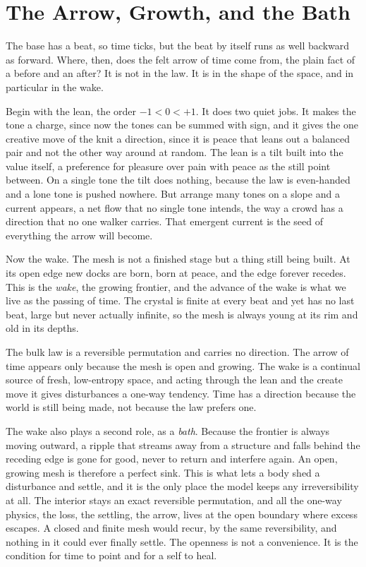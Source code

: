 \section{The Arrow, Growth, and the Bath}

The base has a beat, so time ticks, but the beat by itself runs as well backward as forward. Where, then, does the felt arrow of time come from, the plain fact of a before and an after? It is not in the law. It is in the shape of the space, and in particular in the wake.

Begin with the lean, the order $-1 < 0 < +1$. It does two quiet jobs. It makes the tone a charge, since now the tones can be summed with sign, and it gives the one creative move of the knit a direction, since it is peace that leans out a balanced pair and not the other way around at random. The lean is a tilt built into the value itself, a preference for pleasure over pain with peace as the still point between. On a single tone the tilt does nothing, because the law is even-handed and a lone tone is pushed nowhere. But arrange many tones on a slope and a current appears, a net flow that no single tone intends, the way a crowd has a direction that no one walker carries. That emergent current is the seed of everything the arrow will become.

Now the wake. The mesh is not a finished stage but a thing still being built. At its open edge new docks are born, born at peace, and the edge forever recedes. This is the \emph{wake}, the growing frontier, and the advance of the wake is what we live as the passing of time. The crystal is finite at every beat and yet has no last beat, large but never actually infinite, so the mesh is always young at its rim and old in its depths.

\begin{result}
The bulk law is a reversible permutation and carries no direction. The arrow of time appears only because the mesh is open and growing. The wake is a continual source of fresh, low-entropy space, and acting through the lean and the create move it gives disturbances a one-way tendency. Time has a direction because the world is still being made, not because the law prefers one.
\end{result}

The wake also plays a second role, as a \emph{bath}. Because the frontier is always moving outward, a ripple that streams away from a structure and falls behind the receding edge is gone for good, never to return and interfere again. An open, growing mesh is therefore a perfect sink. This is what lets a body shed a disturbance and settle, and it is the only place the model keeps any irreversibility at all. The interior stays an exact reversible permutation, and all the one-way physics, the loss, the settling, the arrow, lives at the open boundary where excess escapes. A closed and finite mesh would recur, by the same reversibility, and nothing in it could ever finally settle. The openness is not a convenience. It is the condition for time to point and for a self to heal.

